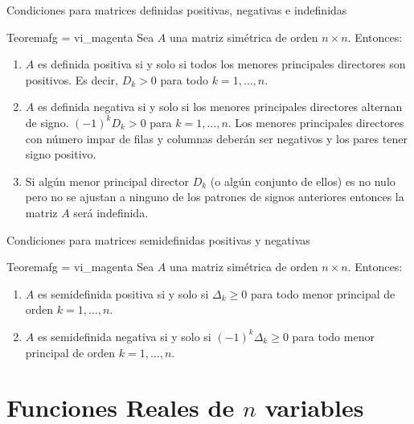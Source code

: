 \documentclass[10pt,aspectratio=169]{beamer}  %
\begin{document}
%
\begin{frame}{Condiciones para matrices definidas positivas, negativas e indefinidas}
	\begin{varblock}{Teorema}{fg = vi_magenta}
		Sea $A$ una matriz simétrica de orden $n \times n$. Entonces:
		\begin{enumerate}[label=(\alph*)]
			\item $A$ es definida positiva si y solo si todos los menores principales directores son positivos. Es decir, 
			$D_k > 0$ para todo $k = 1, \ldots, n$.
			\item $A$ es definida negativa si y solo si los menores principales directores alternan de signo. 
			$(-1)^k D_k > 0$ para $k = 1, \ldots, n$. Los menores principales directores con número impar de filas y
			 columnas deberán ser negativos y los pares tener signo positivo.
			\item Si algún menor principal director $D_k$ (o algún conjunto de ellos) es no nulo pero no se ajustan a ninguno
			de los patrones de signos anteriores entonces la matriz $A$ será indefinida. 
		\end{enumerate}
	\end{varblock}
\end{frame}

%
\begin{frame}{Condiciones para matrices semidefinidas positivas y negativas}
	\begin{varblock}{Teorema}{fg = vi_magenta}
		Sea $A$ una matriz simétrica de orden $n \times n$. Entonces:
		\begin{enumerate}[label=(\alph*)]
			\item $A$ es semidefinida positiva si y solo si $\Delta_k \geq 0$ para todo menor principal de orden $k = 1, \ldots, n$.
			\item $A$ es semidefinida negativa si y solo si $(-1)^k \Delta_k \geq 0$ para todo menor principal de orden $k = 1, \ldots, n$. 
		\end{enumerate}
	\end{varblock}
\end{frame}



% 
\section{Funciones Reales de $n$ variables}
\end{document}
